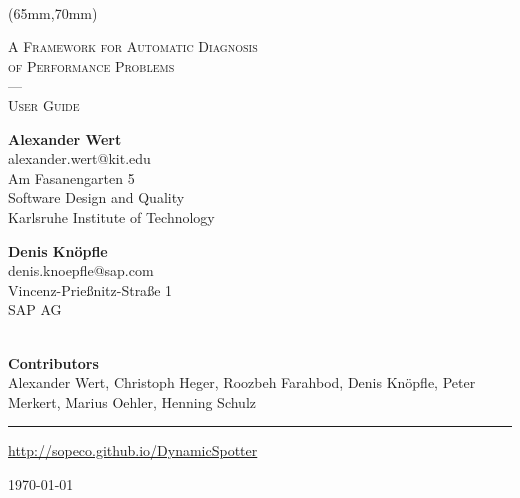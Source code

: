 \documentclass{report}
\newcommand{\link}[1]{\textcolor[rgb]{0.0,0.0,1.0}{\href{#1}{#1}}}
\begin{document}
\begin{titlepage}
\begin{center}
\textsc{}\\[5cm]
\begin{textblock*}{115mm}(65mm,70mm)
\end{textblock*}

\textsc{\LARGE A Framework for Automatic Diagnosis}\\[0.3cm]
\textsc{\LARGE of Performance Problems}\\[1.0cm]
\textsc{---}\\[1.0cm]
\textsc{\Large User Guide}\\[3.0cm]
\newcommand{\HRule}{\rule{\linewidth}{0.5mm}}

\begin{minipage}{0.48\textwidth}
\centering
\Large{
\textbf{Alexander Wert}}
\large{
\\alexander.wert@kit.edu\\ Am
Fasanengarten 5\\
Software Design and Quality
\\
Karlsruhe Institute of Technology
}
\end{minipage}
\hfill
\begin{minipage}{0.48\textwidth}
\centering
\Large{
\textbf{Denis Kn\"opfle}}\\
\large{
denis.knoepfle@sap.com\\
Vincenz-Prie{\ss}nitz-Stra{\ss}e 1\\
SAP AG\\
\textcolor[rgb]{1,1,1}{ }}
\end{minipage}
\\[3.0cm]

\Large{\textbf{Contributors}}\\
\Large{Alexander Wert},
\Large{Christoph Heger},
\Large{Roozbeh Farahbod},
\Large{Denis Kn\"opfle},
\Large{Peter Merkert},
\Large{Marius Oehler},
\Large{Henning Schulz}
\vfill
\HRule

\begin{minipage}{0.4\textwidth}
\begin{flushleft} 
\large \link{http://sopeco.github.io/DynamicSpotter}
\end{flushleft}
\end{minipage}
\hfill
\begin{minipage}{0.4\textwidth}
\begin{flushright} 
\large \today
\end{flushright}
\end{minipage}




\end{center}

\end{titlepage}
\end{document}
